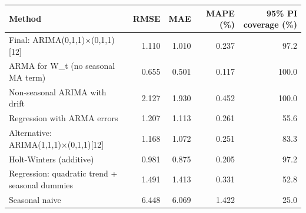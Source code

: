 
\begin{tabular}[t]{lrrrr}
\toprule
Method & RMSE & MAE & MAPE (\%) & 95\% PI coverage (\%)\\
\midrule
Final: ARIMA(0,1,1)×(0,1,1)[12] & 1.110 & 1.010 & 0.237 & 97.2\\
ARMA for W\_t (no seasonal MA term) & 0.655 & 0.501 & 0.117 & 100.0\\
Non-seasonal ARIMA with drift & 2.127 & 1.930 & 0.452 & 100.0\\
Regression with ARMA errors & 1.207 & 1.113 & 0.261 & 55.6\\
Alternative: ARIMA(1,1,1)×(0,1,1)[12] & 1.168 & 1.072 & 0.251 & 83.3\\
Holt-Winters (additive) & 0.981 & 0.875 & 0.205 & 97.2\\
Regression: quadratic trend + seasonal dummies & 1.491 & 1.413 & 0.331 & 52.8\\
Seasonal naive & 6.448 & 6.069 & 1.422 & 25.0\\
\bottomrule
\end{tabular}
